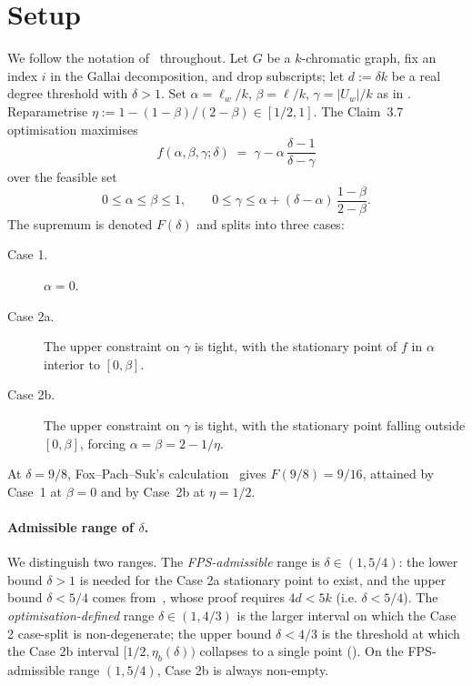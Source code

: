 \documentclass[11pt,a4paper]{article}
\theoremstyle{definition}
\begin{document}
\section{Setup}\label{sec:setup}

We follow the notation of~\cite{FPS} throughout. Let $G$ be a
$k$-chromatic graph, fix an index $i$ in the Gallai decomposition,
and drop subscripts; let $d := \delta k$ be a real degree threshold
with $\delta > 1$. Set $\alpha = \ell_w/k$, $\beta = \ell/k$,
$\gamma = |U_w|/k$ as in \cite[\S 3]{FPS}.
Reparametrise $\eta := 1 - (1-\beta)/(2-\beta) \in [1/2, 1]$.
The Claim~3.7 optimisation maximises
\begin{equation}\label{eq:obj}
   f(\alpha, \beta, \gamma; \delta) \;=\;
     \gamma - \alpha\,\frac{\delta - 1}{\delta - \gamma}
\end{equation}
over the feasible set
\begin{equation}\label{eq:constraints}
   0 \le \alpha \le \beta \le 1, \qquad
   0 \le \gamma \le \alpha + (\delta - \alpha)\,\frac{1 - \beta}{2 - \beta}.
\end{equation}
The supremum is denoted $F(\delta)$ and splits into three cases:
\begin{description}
\item[Case 1.] $\alpha = 0$.
\item[Case 2a.] The upper constraint on $\gamma$ is tight, with the
  stationary point of $f$ in $\alpha$ interior to $[0, \beta]$.
\item[Case 2b.] The upper constraint on $\gamma$ is tight, with
  the stationary point falling outside $[0, \beta]$, forcing
  $\alpha = \beta = 2 - 1/\eta$.
\end{description}
At $\delta = 9/8$, Fox--Pach--Suk's calculation~\cite[p.~10]{FPS}
gives $F(9/8) = 9/16$, attained by Case~1 at $\beta = 0$ and by
Case~2b at $\eta = 1/2$.

\paragraph{Admissible range of $\delta$.}
We distinguish two ranges. The \emph{FPS-admissible} range is
$\delta \in (1, 5/4)$: the lower bound $\delta > 1$ is needed for
the Case 2a stationary point to exist, and the upper bound
$\delta < 5/4$ comes from~\cite[Claim 3.6]{FPS}, whose proof
requires $4d < 5k$ (i.e. $\delta < 5/4$). The
\emph{optimisation-defined} range $\delta \in (1, 4/3)$ is the
larger interval on which the Case 2 case-split is non-degenerate;
the upper bound $\delta < 4/3$ is the threshold at which the
Case 2b interval $[1/2, \eta_b(\delta))$ collapses to a single
point (). On the FPS-admissible range
$(1, 5/4)$, Case 2b is always non-empty.
\end{document}
